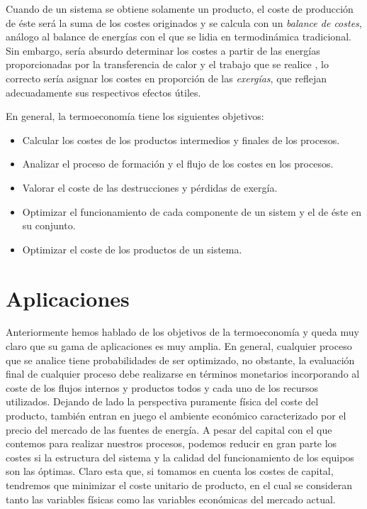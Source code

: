 \documentclass[12pt, letterpaper]{article}
\begin{document}
Cuando de un sistema se obtiene solamente un producto, el coste de producción de éste será la suma de los costes originados y se calcula con un \textit{balance de costes}, análogo al balance de energías con el que se lidia en termodinámica tradicional. Sin embargo, sería absurdo determinar los costes a partir de las energías proporcionadas por la transferencia de calor y el trabajo que se realice , lo correcto sería asignar los costes en proporción de las \textit{exergías}, que reflejan adecuadamente sus respectivos efectos útiles. \autocite{montes09}

En general, la termoeconomía tiene los siguientes objetivos:

\begin{itemize}
	\item Calcular los costes de los productos intermedios y finales de los procesos.
	\item Analizar el proceso de formación y el flujo de los costes en los procesos.
	\item Valorar el coste de las destrucciones y pérdidas de exergía.
	\item Optimizar el funcionamiento de cada componente de un sistem y el de éste en su conjunto.
	\item Optimizar el coste de los productos de un sistema.
\end{itemize}

\section*{Aplicaciones}

Anteriormente hemos hablado de los objetivos de la termoeconomía y queda muy claro que su gama de aplicaciones es muy amplia. En general, cualquier proceso que se analice tiene probabilidades de ser optimizado, no obstante, la evaluación final de cualquier proceso debe realizarse en términos monetarios incorporando al coste de los flujos internos y productos todos y cada uno de los recursos utilizados. Dejando de lado la perspectiva puramente física del coste del producto, también entran en juego el ambiente económico caracterizado por el precio del mercado de las fuentes de energía. A pesar del capital con el que contemos para realizar nuestros procesos, podemos reducir en gran parte los costes si la estructura del sistema y la calidad del funcionamiento de los equipos son las óptimas. Claro esta que, si tomamos en cuenta los costes de capital, tendremos que minimizar el coste unitario de producto, en el cual se consideran tanto las variables físicas como las variables económicas del mercado actual.\autocite{lozano97}
\end{document}
